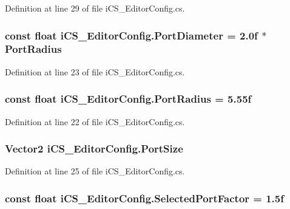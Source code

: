 Definition at line 29 of file i\+C\+S\+\_\+\+Editor\+Config.\+cs.

\hypertarget{classi_c_s___editor_config_ab189cc729baea3cf886be53355f172b1}{
\subsubsection[{Port\+Diameter}]{\setlength{\rightskip}{0pt plus 5cm}const float i\+C\+S\+\_\+\+Editor\+Config.\+Port\+Diameter = 2.\+0f $\ast$ Port\+Radius}}\label{classi_c_s___editor_config_ab189cc729baea3cf886be53355f172b1}


Definition at line 23 of file i\+C\+S\+\_\+\+Editor\+Config.\+cs.

\hypertarget{classi_c_s___editor_config_aec911aafdfcff1672a147c88454ad335}{
\subsubsection[{Port\+Radius}]{\setlength{\rightskip}{0pt plus 5cm}const float i\+C\+S\+\_\+\+Editor\+Config.\+Port\+Radius = 5.\+55f}}\label{classi_c_s___editor_config_aec911aafdfcff1672a147c88454ad335}


Definition at line 22 of file i\+C\+S\+\_\+\+Editor\+Config.\+cs.

\hypertarget{classi_c_s___editor_config_acad057d1aa3ecc6b038d3fa545c2b973}{
\subsubsection[{Port\+Size}]{\setlength{\rightskip}{0pt plus 5cm}Vector2 i\+C\+S\+\_\+\+Editor\+Config.\+Port\+Size\hspace{0.3cm}{\ttfamily [static]}}}\label{classi_c_s___editor_config_acad057d1aa3ecc6b038d3fa545c2b973}


Definition at line 25 of file i\+C\+S\+\_\+\+Editor\+Config.\+cs.

\hypertarget{classi_c_s___editor_config_af22b9eb56e77a058c21e2571a29995ca}{
\subsubsection[{Selected\+Port\+Factor}]{\setlength{\rightskip}{0pt plus 5cm}const float i\+C\+S\+\_\+\+Editor\+Config.\+Selected\+Port\+Factor = 1.\+5f}}\label{classi_c_s___editor_config_af22b9eb56e77a058c21e2571a29995ca}


